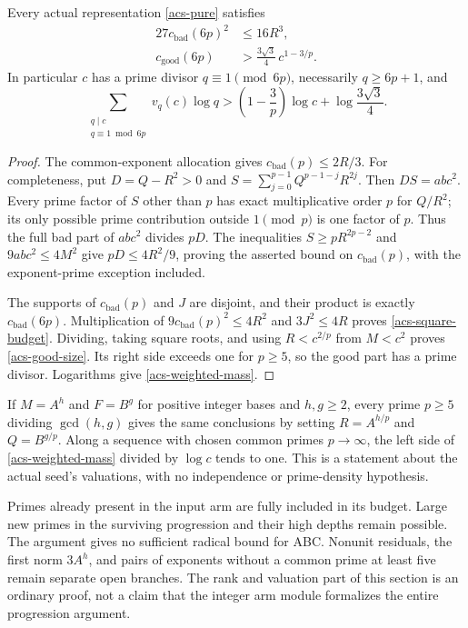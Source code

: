 \begin{theorem}\label{acs-mass}
Every actual representation \eqref{acs-pure} satisfies
\begin{align}
 27c_{\mathrm{bad}}(6p)^2&\le16R^3,\label{acs-square-budget}\\
 c_{\mathrm{good}}(6p)&>
       \frac{3\sqrt3}{4}\,c^{1-3/p}.\label{acs-good-size}
\end{align}
In particular $c$ has a prime divisor $q\equiv1\pmod{6p}$, necessarily
$q\ge6p+1$, and
\begin{equation}\label{acs-weighted-mass}
 \sum_{\substack{q\mid c\\q\equiv1\bmod6p}}v_q(c)\log q
 >\left(1-\frac3p\right)\log c+\log\frac{3\sqrt3}{4}.
\end{equation}
\end{theorem}
\begin{proof}
The common-exponent allocation gives $c_{\mathrm{bad}}(p)\le2R/3$.
For completeness, put $D=Q-R^2>0$ and
$S=\sum_{j=0}^{p-1}Q^{p-1-j}R^{2j}$. Then $DS=ab c^2$.
Every prime factor of $S$ other than $p$ has exact multiplicative
order $p$ for $Q/R^2$; its only possible prime contribution outside
$1\pmod p$ is one factor of $p$. Thus the full bad part of $ab c^2$
divides $pD$. The inequalities $S\ge pR^{2p-2}$ and
$9ab c^2\le4M^2$ give $pD\le4R^2/9$, proving the asserted bound
on $c_{\mathrm{bad}}(p)$, with the exponent-prime exception included.

The supports of $c_{\mathrm{bad}}(p)$ and $J$ are disjoint, and
their product is exactly $c_{\mathrm{bad}}(6p)$. Multiplication of
$9c_{\mathrm{bad}}(p)^2\le4R^2$ and $3J^2\le4R$ proves
\eqref{acs-square-budget}. Dividing, taking square roots, and using
$R<c^{2/p}$ from $M<c^2$ proves \eqref{acs-good-size}.
Its right side exceeds one for $p\ge5$, so the good part has a
prime divisor. Logarithms give \eqref{acs-weighted-mass}.
\end{proof}

If $M=A^h$ and $F=B^g$ for positive integer bases and $h,g\ge2$,
every prime $p\ge5$ dividing $\gcd(h,g)$ gives the same conclusions
by setting $R=A^{h/p}$ and $Q=B^{g/p}$. Along a sequence with chosen
common primes $p\to\infty$, the left side of
\eqref{acs-weighted-mass} divided by $\log c$ tends to one. This is
a statement about the actual seed's valuations, with no independence
or prime-density hypothesis.

Primes already present in the input arm are fully included in its
budget. Large new primes in the surviving progression and their high
depths remain possible. The argument gives no sufficient radical
bound for ABC. Nonunit residuals, the first norm $3A^h$, and pairs
of exponents without a common prime at least five remain separate
open branches. The rank and valuation part of this section is an
ordinary proof, not a claim that the integer arm module formalizes
the entire progression argument.
